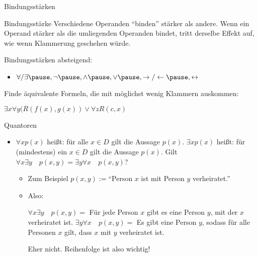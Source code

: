 \documentclass[handout]{beamer}
\begin{document}
\begin{frame}{Bindungsstärken}
	\begin{block}{Bindungsstärke}
		Verschiedene Operanden ``binden'' stärker als andere. \ip Wenn ein Operand stärker als die umliegenden Operanden bindet, tritt derselbe Effekt auf, wie wenn Klammerung geschehen würde.
	\end{block}

	\bp
	
	Bindungsstärken absteigend:
	\begin{itemize}
		\ip \item $\forall / \exists\ip,\lnot\ip,\land\ip,\lor\ip,\rightarrow/\leftarrow\ip,\leftrightarrow$
	\end{itemize}

	\bp
	
	Finde äquivalente Formeln, die mit möglichst wenig Klammern auskommen:
	\begin{itemize}
		\pitem $\exists x \forall y (R(f(x), g(x)) \lor \forall z R(c, x)$ %
	\end{itemize}

\end{frame}
\begin{frame}{Quantoren}
\begin{itemize}
	\item $\forall x p(x)$ heißt\ip: für alle $x \in D$ gilt die Aussage $p(x)$.
	\pitem $\exists x p(x)$ heißt\ip: für (mindestens) ein $x \in D$ gilt die Aussage $p(x)$.
	\pitem Gilt $\forall x \exists y \quad p(x,y) = \exists y \forall x \quad p(x,y)$?
	\begin{itemize}
		\pause\item Zum Beispiel $p(x,y) := $``Person $x$ ist mit Person $y$ verheiratet.''
		\pause\item Also:
		\begin{itemize}
			\pitem $\forall x \exists y \quad p(x,y) = $ Für jede Person $x$ gibt es eine Person $y$, mit der $x$ verheiratet ist.
			\pitem $\exists y \forall x \quad p(x,y) = $ Es gibt eine Person $y$, sodass für alle Personen $x$ gilt, dass $x$ mit $y$ verheiratet ist.
		\end{itemize}
		\pitem Eher nicht. Reihenfolge ist also wichtig!
	\end{itemize}
\end{itemize}
\end{frame}
\end{document}
